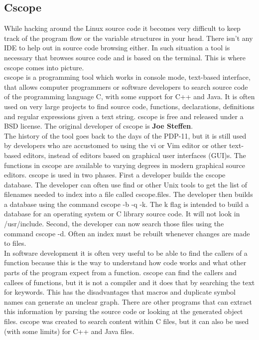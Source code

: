 \subsection{Cscope}
While hacking around the Linux source code it becomes very difficult to keep track of the program flow or the variable structures in your head. There isn’t any IDE to help out in source code browsing either. In such situation a tool is necessary that browses source code and is based on the terminal. This is where cscope comes into picture.\\
cscope is a programming tool which works in console mode, text-based interface, that allows computer programmers or software developers to search source code of the programming language C, with some support for C++ and Java. It is often used on very large projects to find source code, functions, declarations, definitions and regular expressions given a text string. cscope is free and released under a BSD license. The original developer of cscope is \textbf{Joe Steffen}.\\
The history of the tool goes back to the days of the PDP-11, but it is still used by developers who are accustomed to using the vi or Vim editor or other text-based editors, instead of editors based on graphical user interfaces (GUI)s. The functions in cscope are available to varying degrees in modern graphical source editors.
cscope is used in two phases. First a developer builds the cscope database. The developer can often use find or other Unix tools to get the list of filenames needed to index into a file called cscope.files. The developer then builds a database using the command cscope -b -q -k. The k flag is intended to build a database for an operating system or C library source code. It will not look in /usr/include. Second, the developer can now search those files using the command cscope -d. Often an index must be rebuilt whenever changes are made to files.\\
In software development it is often very useful to be able to find the callers of a function because this is the way to understand how code works and what other parts of the program expect from a function. cscope can find the callers and callees of functions, but it is not a compiler and it does that by searching the text for keywords. This has the disadvantages that macros and duplicate symbol names can generate an unclear graph. There are other programs that can extract this information by parsing the source code or looking at the generated object files.
cscope was created to search content within C files, but it can also be used (with some limits) for C++ and Java files.
